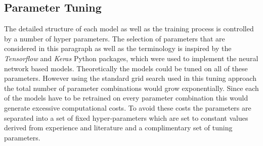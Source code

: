 \subsection{Parameter Tuning}
The detailed structure of each model as well as the training process is controlled by a number of hyper parameters. The selection of parameters that are considered in this paragraph as well as the terminology is inspired by the \textit{Tensorflow} and \textit{Keras} Python packages, which were used to implement the neural network based models. Theoretically the models could be tuned on all of these parameters. However using the standard grid search used in this tuning approach the total number of parameter combinations would grow exponentially. Since each of the models have to be retrained on every parameter combination this would generate excessive computational costs. To avoid these costs the parameters are separated into a set of fixed hyper-parameters which are set to constant values derived from experience and literature and a complimentary set of tuning parameters.
